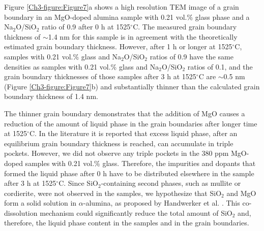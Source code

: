 Figure \ref{Ch3-figure:Figure7}a shows a high resolution TEM image of a grain boundary in an MgO-doped alumina sample with 0.21 vol.\% glass phase and a Na$_{2}$O/SiO$_{2}$ ratio of 0.9 after 0 h at 1525$^{\circ}$C. The measured grain boundary thickness of $\sim$1.4 nm for this sample is in agreement with the theoretically estimated \cite{Frueh2016a} grain boundary thickness. However, after 1 h or longer at 1525$^{\circ}$C, samples with 0.21 vol.\% glass and Na$_{2}$O/SiO$_{2}$ ratios of 0.9 have the same densities as samples with 0.21 vol.\% glass and Na$_{2}$O/SiO$_{2}$ ratios of 0.1, and the grain boundary thicknesses of those samples after 3 h at 1525$^{\circ}$C are $\sim$0.5 nm (Figure \ref{Ch3-figure:Figure7}b) and substantially thinner than the calculated grain boundary thickness of 1.4 nm.

The thinner grain boundary demonstrates that the addition of MgO causes a reduction of the amount of liquid phase in the grain boundaries after longer time at 1525$^{\circ}$C. In the literature it is reported that excess liquid phase, after an equilibrium grain boundary thickness \cite{Subramaniam2006} is reached, can accumulate in triple pockets. However, we did not observe any triple pockets in the 380 ppm MgO-doped samples with 0.21 vol.\% glass. Therefore, the impurities and dopants that formed the liquid phase after 0 h have to be distributed elsewhere in the sample after 3 h at 1525$^{\circ}$C. Since SiO$_{2}$-containing second phases, such as mullite or cordierite, were not observed in the samples, we hypothesize that SiO$_{2}$ and MgO form a solid solution in $\alpha$-alumina, as proposed by Handwerker et al. \cite{Handwerker1989}. This co-dissolution mechanism could significantly reduce the total amount of SiO$_{2}$ and, therefore, the liquid phase content in the samples and in the grain boundaries. 

